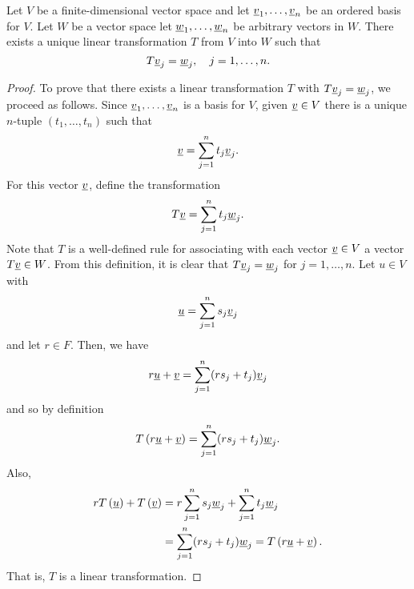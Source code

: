 \iffalse
\begin{theorem} \label{theorem:UniqueLinearTransformation}
Let $V$ be a finite-dimensional vector space and let $\underline{v}_1, \ldots, \underline{v}_n$ be an ordered basis for $V$.
Let $W$ be a vector space let $\underline{w}_1, \ldots, \underline{w}_n$ be arbitrary vectors in $W$.
There exists a unique linear transformation $T$ from $V$ into $W$ such that
\begin{equation*}
T \underline{v}_j = \underline{w}_j, \quad j= 1, \ldots, n.
\end{equation*}
\end{theorem}
\begin{proof}
To prove that there exists a linear transformation $T$ with $T \underline{v}_j = \underline{w}_j$, we proceed as follows.
Since $\underline{v}_1, \ldots, \underline{v}_n$ is a basis for $V$, given $\underline{v} \in V$ there is a unique $n$-tuple $(t_1, \ldots, t_n)$ such that
\begin{equation*}
\underline{v} = \sum_{j=1}^n t_j \underline{v}_j .
\end{equation*}
For this vector $\underline{v}$, define the transformation
\begin{equation*}
T \underline{v} = \sum_{j=1}^n t_j \underline{w}_j .
\end{equation*}
Note that $T$ is a well-defined rule for associating with each vector $\underline{v} \in V$ a vector $T\underline{v} \in W$.
From this definition, it is clear that $T \underline{v}_j = \underline{w}_j$ for $j = 1, \ldots, n$.
Let $u \in V$ with
\begin{equation*}
\underline{u} = \sum_{j=1}^n s_j \underline{v}_j
\end{equation*}
and let $r \in F$.
Then, we have
\begin{equation*}
r \underline{u} + \underline{v} = \sum_{j=1}^n (r s_j + t_j) \underline{v}_j
\end{equation*}
and so by definition
\begin{equation*}
T \left( r \underline{u} + \underline{v} \right)
= \sum_{j=1}^n (r s_j + t_j) \underline{w}_j .
\end{equation*}
Also,
\begin{equation*}
\begin{split}
r T \left( \underline{u} \right) + T \left( \underline{v} \right)
&= r \sum_{j=1}^n s_j \underline{w}_j
+ \sum_{j=1}^n t_j \underline{w}_j \\
&= \sum_{j=1}^n (r s_j + t_j) \underline{w}_j
= T \left( r \underline{u} + \underline{v} \right) .
\end{split}
\end{equation*}
That is, $T$ is a linear transformation.


\end{proof}
